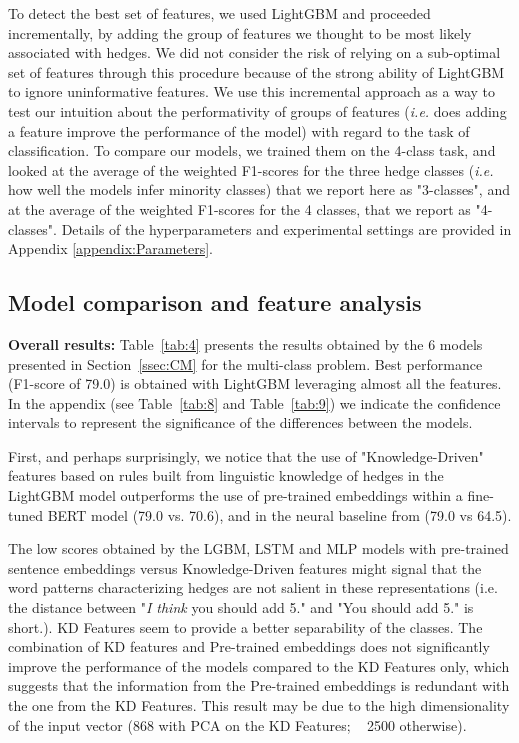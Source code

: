 \documentclass[11pt]{article}
\begin{document}
\noindent To detect the best set of features, we used LightGBM and proceeded incrementally, by adding the group of features we thought to be most likely associated with hedges. We did not consider the risk of relying on a sub-optimal set of features through this procedure because of the strong ability of LightGBM to ignore uninformative features. 
We use this incremental approach as a way to test our intuition about the performativity of groups of features (\textit{i.e.} does adding a feature improve the performance of the model) with regard to the task of classification. To compare our models, we trained them on the 4-class task, and looked at the average of the weighted F1-scores for the three hedge classes (\textit{i.e.} how well the models infer minority classes) that we report here as "3-classes", and at the average of the weighted F1-scores for the 4 classes, that we report as "4-classes". Details of the hyperparameters and experimental settings are provided in Appendix \ref{appendix:Parameters}.

\subsection{Model comparison and feature analysis}
\noindent\textbf{Overall results:} Table~\ref{tab:4} presents the results obtained by the 6 models presented in Section~\ref{ssec:CM} for the multi-class problem. 
Best performance (F1-score of 79.0) is obtained with LightGBM leveraging almost all the features. In the appendix (see Table~\ref{tab:8} and Table~\ref{tab:9}) we indicate the confidence intervals to represent the significance of the differences between the models. 

\noindent First, and perhaps surprisingly, we notice that the use of "Knowledge-Driven" features based on rules built from linguistic knowledge of hedges in the LightGBM model outperforms the use of pre-trained embeddings within a fine-tuned BERT model (79.0 vs. 70.6), and in the neural baseline from \cite{Goel2019} (79.0 vs 64.5).

\noindent The low scores obtained by the LGBM, LSTM and MLP models with pre-trained sentence embeddings versus Knowledge-Driven features might signal that the word patterns characterizing hedges are not salient in these representations (i.e. the distance between "\textit{I think} you should add 5." and "You should add 5." is short.). KD Features seem to provide a better separability of the classes. The combination of KD features and Pre-trained embeddings does not significantly improve the performance of the models compared to the KD Features only, which suggests that the information from the Pre-trained embeddings is redundant with the one from the KD Features. This result may be due to the high dimensionality of the input vector (868 with PCA on the KD Features; ~ 2500 otherwise).
\end{document}
